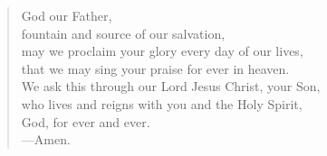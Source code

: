 \prayer

\setlength{\leftmargini}{\prayerleftmargini}

\begin{verse}
God our Father,\\
fountain and source of our salvation,\\
may we proclaim your glory every day of our lives,\\
that we may sing your praise for ever in heaven.\\
We ask this through our Lord Jesus Christ, your Son,\\
who lives and reigns with you and the Holy Spirit,\\
God, for ever and ever.\\
{\color{red}---\thinspace}Amen.
\end{verse}

\setlength{\leftmargini}{\defleftmargini}